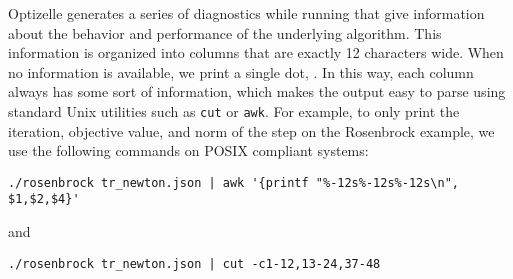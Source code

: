\documentclass{report}
\makeatletter
\DeclareRobustCommand*{\textct}[1]{%
  \begingroup\@activeus\scantokens{\texttt{#1}\endinput}\endgroup}
\makeatother
\begin{document}
        Optizelle generates a series of diagnostics while running that give information about the behavior and performance of the underlying algorithm.  This information is organized into columns that are exactly 12 characters wide.  When no information is available, we print a single dot, \textct{.}.  In this way, each column always has some sort of information, which makes the output easy to parse using standard Unix utilities such as \texttt{cut} or \texttt{awk}.  For example, to only print the iteration, objective value, and norm of the step on the Rosenbrock example, we use the following commands on POSIX compliant systems:
\begin{center}\begin{verbatim}
./rosenbrock tr_newton.json | awk '{printf "%-12s%-12s%-12s\n", $1,$2,$4}'
\end{verbatim}\end{center}
\noindent and
\begin{center}\begin{verbatim}
./rosenbrock tr_newton.json | cut -c1-12,13-24,37-48
\end{verbatim}\end{center}
        
\end{document}
